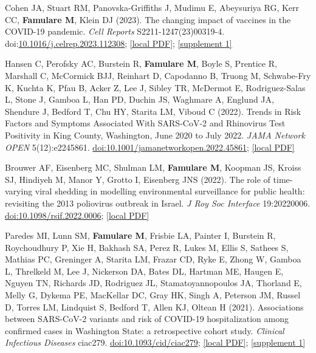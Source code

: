 \documentclass{article}
\begin{document}
\begin{llist}
\begin{items}
\item[{[31]}] Cohen JA, Stuart RM, Panovska-Griffiths J, Mudimu E, Abeysuriya RG, Kerr CC, \textbf{Famulare M}, Klein DJ (2023). The changing impact of vaccines in the COVID-19 pandemic. \emph{Cell Reports} S2211-1247(23)00319-4. doi:\href{https://doi.org/10.1016/j.celrep.2023.112308}{10.1016/j.celrep.2023.112308}; \href{https://famulare.github.io/assets/publication-mirror/journal-31.pdf}{[local PDF]}; \href{https://famulare.github.io/assets/publication-mirror/supplements/journal-articles-31-mmc2.xlsx}{[supplement 1]}

\item[{[30]}] Hansen C, Perofsky AC, Burstein R, \textbf{Famulare M}, Boyle S, Prentice R, Marshall C, McCormick BJJ, Reinhart D, Capodanno B, Truong M, Schwabe-Fry K, Kuchta K, Pfau B, Acker Z, Lee J, Sibley TR, McDermot E, Rodriguez-Salas L, Stone J, Gamboa L, Han PD, Duchin JS, Waghmare A, Englund JA, Shendure J, Bedford T, Chu HY, Starita LM, Viboud C (2022). Trends in Risk Factors and Symptoms Associated With SARS-CoV-2 and Rhinovirus Test Positivity in King County, Washington, June 2020 to July 2022. \emph{JAMA Network OPEN} 5(12):e2245861. \href{https://doi.org/10.1001/jamanetworkopen.2022.45861}{doi:10.1001/jamanetworkopen.2022.45861}; \href{https://famulare.github.io/assets/publication-mirror/journal-30.pdf}{[local PDF]}

\item[{[29]}] Brouwer AF, Eisenberg MC, Shulman LM, \textbf{Famulare M}, Koopman JS, Kroiss SJ, Hindiyeh M, Manor Y, Grotto I, Eisenberg JNS (2022). The role of time-varying viral shedding in modelling environmental surveillance for public health: revisiting the 2013 poliovirus outbreak in Israel. \emph{J Roy Soc Interface} 19:20220006. \href{https://doi.org/10.1098/rsif.2022.0006}{doi:10.1098/rsif.2022.0006}; \href{https://famulare.github.io/assets/publication-mirror/journal-29.pdf}{[local PDF]}

\item[{[28]}] Paredes MI, Lunn SM, \textbf{Famulare M}, Frisbie LA, Painter I, Burstein R, Roychoudhury P, Xie H, Bakhash SA, Perez R, Lukes M, Ellis S, Sathees S, Mathias PC, Greninger A, Starita LM, Frazar CD, Ryke E, Zhong W, Gamboa L, Threlkeld M, Lee J, Nickerson DA, Bates DL, Hartman ME, Haugen E, Nguyen TN, Richards JD, Rodriguez JL, Stamatoyannopoulos JA, Thorland E, Melly G, Dykema PE, MacKellar DC, Gray HK, Singh A, Peterson JM, Russel D, Torres LM, Lindquist S, Bedford T, Allen KJ, Oltean H (2021). Associations between SARS-CoV-2 variants and risk of COVID-19 hospitalization among confirmed cases in Washington State: a retrospective cohort study. \emph{Clinical Infectious Diseases} ciac279. \href{https://doi.org/10.1093/cid/ciac279}{doi:10.1093/cid/ciac279}; \href{https://famulare.github.io/assets/publication-mirror/journal-28.pdf}{[local PDF]}; \href{https://famulare.github.io/assets/publication-mirror/supplements/journal-articles-28-ciac279_supplementary_data.docx}{[supplement 1]}


\end{items}
\end{llist}
\end{document}
